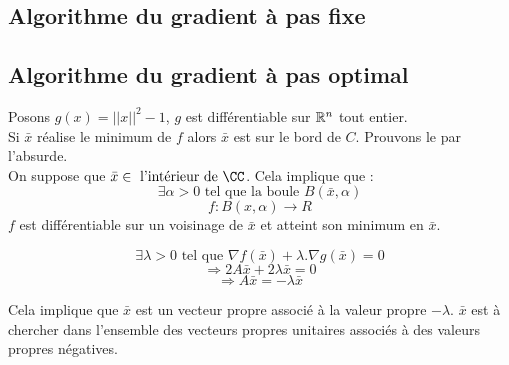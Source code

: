 \subsection{Algorithme du gradient à pas fixe}
\subsection{Algorithme du gradient à pas optimal}

	





Posons $ g(x) = ||x||^2 - 1 $, $g$ est différentiable sur $\mathbb{R}^n$ tout entier.\\
Si $\bar{x}$ réalise le minimum de $f$ alors $\bar{x}$ est sur le bord de $C$. Prouvons le par l'absurde.\\
On suppose que $\bar{x} \in \text{ l'intérieur de }\CC $.
Cela implique que : \[ \exists \alpha>0 \text{ tel que la boule } B(\bar{x},\alpha)  \]
\[ f : B(x,\alpha) \rightarrow R \]
$f$ est différentiable sur un voisinage de $\bar{x}$ et atteint son minimum en $\bar{x}$.


\[ \exists \lambda > 0 \text{ tel que } \nabla f(\bar{x}) + \lambda.\nabla g(\bar{x}) = 0 \]
\[ \Rightarrow 2A\bar{x} + 2\lambda\bar{x} = 0 \]
\[ \Rightarrow A\bar{x} = - \lambda\bar{x}\]

Cela implique que $\bar{x}$ est un vecteur propre associé à la valeur propre $-\lambda$. $\bar{x}$ est à chercher dans l'ensemble des vecteurs propres unitaires associés à des valeurs propres négatives.












